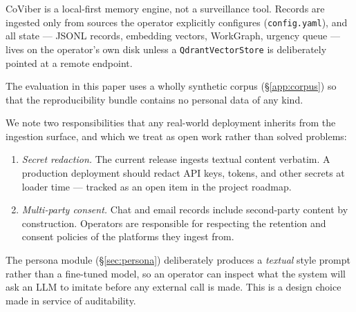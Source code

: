 CoViber is a local-first memory engine, not a surveillance tool. Records are
ingested only from sources the operator explicitly configures
(\texttt{config.yaml}), and all state --- JSONL records, embedding vectors,
WorkGraph, urgency queue --- lives on the operator's own disk unless a
\texttt{QdrantVectorStore} is deliberately pointed at a remote endpoint.

The evaluation in this paper uses a wholly synthetic corpus
(\S\ref{app:corpus}) so that the reproducibility bundle contains no
personal data of any kind.

We note two responsibilities that any real-world deployment inherits from the
ingestion surface, and which we treat as open work rather than solved
problems:

\begin{enumerate}
  \item \emph{Secret redaction.} The current release ingests textual content
        verbatim. A production deployment should redact API keys, tokens, and
        other secrets at loader time --- tracked as an open item in the
        project roadmap.
  \item \emph{Multi-party consent.} Chat and email records include
        second-party content by construction. Operators are responsible for
        respecting the retention and consent policies of the platforms
        they ingest from.
\end{enumerate}

The persona module (\S\ref{sec:persona}) deliberately produces a
\emph{textual} style prompt rather than a fine-tuned model, so an operator
can inspect what the system will ask an LLM to imitate before any external
call is made. This is a design choice made in service of auditability.

